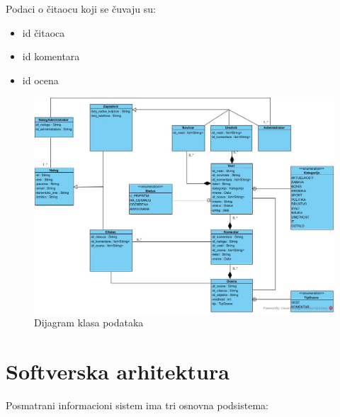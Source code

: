 \documentclass{article}
\begin{document}
Podaci o čitaocu koji se čuvaju su:
\begin{itemize}
    \item id čitaoca
    \item id komentara
    \item id ocena
\end{itemize}


\begin{figure}[htbp!]
    \centering
    \includegraphics[scale=0.4]{Dijagram_klasa.jpg}
    \caption{Dijagram klasa podataka}
    \label{slk:dtp}
\end{figure}

\newpage

\section{Softverska arhitektura}

Posmatrani informacioni sistem ima tri osnovna podsistema:
\end{document}
